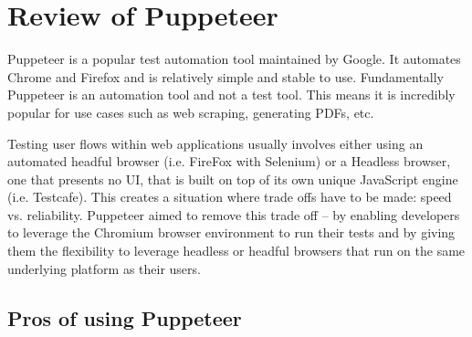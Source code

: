 \documentclass[12pt,a4paper,titlepage]{report}
\begin{document}
\section{Review of Puppeteer}

Puppeteer is a popular test automation tool maintained by Google. It automates Chrome and Firefox and is relatively simple and stable to use.
Fundamentally Puppeteer is an automation tool and not a test tool.
This means it is incredibly popular for use cases such as web scraping, generating PDFs, etc.

Testing user flows within web applications usually involves either using an automated headful
browser (i.e. FireFox with Selenium) or a Headless browser, one that presents no UI, that is built on top of its own unique JavaScript
engine (i.e. Testcafe). This creates a situation where trade offs have to be made: speed vs. reliability.
Puppeteer aimed to remove this trade off – by enabling developers to leverage the Chromium browser environment
to run their tests and by giving them the flexibility to leverage headless or headful browsers that run on the same underlying platform as their users.

\subsection{Pros of using Puppeteer}
\end{document}
